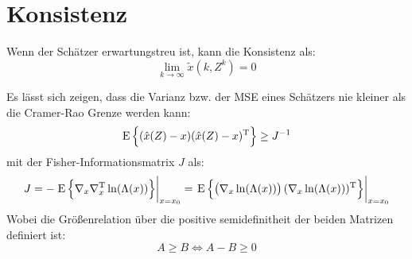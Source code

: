 \section{Konsistenz}
Wenn der Schätzer erwartungstreu ist, kann die Konsistenz als:
\begin{equation*}
    \lim_{k \to \infty} \tilde{x}(k, Z^k) = 0
\end{equation*}

Es lässt sich zeigen, dass die Varianz bzw. der MSE eines Schätzers nie kleiner als die Cramer-Rao Grenze werden kann:
\begin{equation*}
    \operatorname*{E}\left\{(\hat{x}(Z) - x) (\hat{x}(Z) - x)^\text{T}\right\} \geq J^{-1}
\end{equation*}
mit der Fisher-Informationsmatrix $J$ als:
\begin{equation*}
    J = -\left. \operatorname*{E}\left\{\nabla_x \nabla^\text{T}_x \ln(\Lambda(x))\right\} \right|_{x=x_0} 
        = \left. \operatorname*{E}\left\{\left(\nabla_x \ln(\Lambda(x))\right) (\nabla_x \ln(\Lambda(x)))^\text{T}\right\} \right|_{x=x_0}
\end{equation*}
Wobei die Größenrelation über die positive semidefinitheit der beiden Matrizen definiert ist:
\begin{equation*}
    A \geq B \Leftrightarrow A - B \geq 0
\end{equation*}
